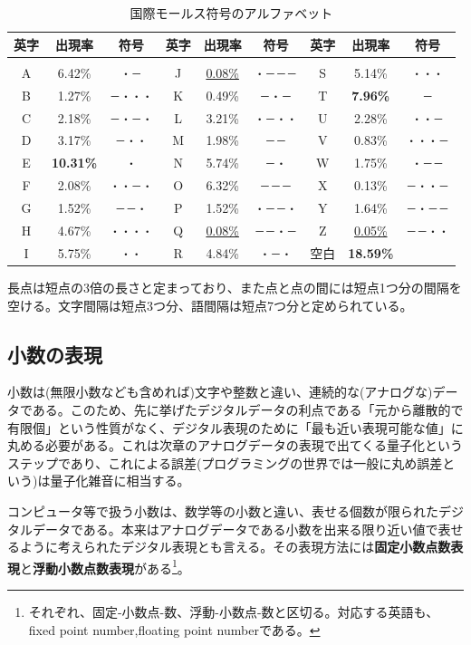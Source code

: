 \begin{table}[htbp]
\centering
\caption{国際モールス符号のアルファベット}\label{table1_3}
\begin{tabular}{|c|c|c||c|c|c||c|c|c|}\hline
英字&出現率&符号&英字&出現率&符号&英字&出現率&符号\\ \hline  
&&&&&&&& \\[-15pt] \hline
A&6.42\%&\verb|・－|&J&\underline{0.08\%}&\verb|・－－－|&S&5.14\%&\verb|・・・|\\ \hline
B&1.27\%&\verb|－・・・|&K&0.49\%&\verb|－・－|&T&\textbf{7.96\%}&\verb|－|\\ \hline
C&2.18\%&\verb|－・－・|&L&3.21\%&\verb|・－・・|&U&2.28\%&\verb|・・－|\\ \hline	
D&3.17\%&\verb|－・・|&M&1.98\%&\verb|－－|&V&0.83\%&\verb|・・・－|\\ \hline			
E&\textbf{10.31\%}&\verb|・|&N&5.74\%&\verb|－・|&W&1.75\%&\verb|・－－|\\ \hline	
F&2.08\%&\verb|・・－・|&O&6.32\%&\verb|－－－|&X&0.13\%&\verb|－・・－|\\ \hline
G&1.52\%&\verb|－－・|&P&1.52\%&\verb|・－－・|&Y&1.64\%&\verb|－・－－|\\ \hline
H&4.67\%&\verb|・・・・|&Q&\underline{0.08\%}&\verb|－－・－|&Z&\underline{0.05\%}&\verb|－－・・|\\ \hline
I&5.75\%&\verb|・・|&R&4.84\%&\verb|・－・|&空白&\textbf{18.59\%}&\\ \hline
\end{tabular}
\end{table}

長点は短点の3倍の長さと定まっており、また点と点の間には短点1つ分の間隔を空ける。文字間隔は短点3つ分、語間隔は短点7つ分と定められている。

\subsection{小数の表現}
小数は(無限小数なども含めれば)文字や整数と違い、連続的な(アナログな)データである。このため、先に挙げたデジタルデータの利点である「元から離散的で有限個」という性質がなく、デジタル表現のために「最も近い表現可能な値」に丸める必要がある。これは次章のアナログデータの表現で出てくる量子化というステップであり、これによる誤差(プログラミングの世界では一般に丸め誤差という)は量子化雑音に相当する。

コンピュータ等で扱う小数は、数学等の小数と違い、表せる個数が限られたデジタルデータである。本来はアナログデータである小数を出来る限り近い値で表せるように考えられたデジタル表現とも言える。その表現方法には\textbf{固定小数点数表現}と\textbf{浮動小数点数表現}がある\footnote{それぞれ、固定-小数点-数、浮動-小数点-数と区切る。対応する英語も、fixed point number,floating point numberである。}。


